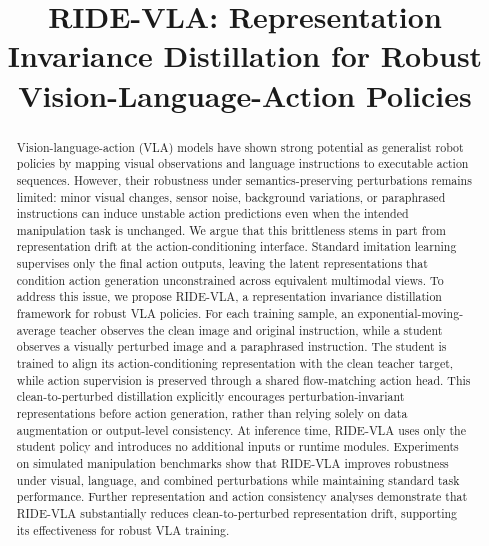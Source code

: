\documentclass[letterpaper]{article} %
\title{\textsc{RIDE-VLA}: Representation Invariance Distillation for Robust Vision-Language-Action Policies}
\newcommand{\method}{\textsc{RIDE-VLA}}
\begin{document}
\maketitle

\begin{abstract}
Vision-language-action (VLA) models have shown strong potential as generalist robot policies by mapping visual observations and language instructions to executable action sequences. However, their robustness under semantics-preserving perturbations remains limited: minor visual changes, sensor noise, background variations, or paraphrased instructions can induce unstable action predictions even when the intended manipulation task is unchanged. We argue that this brittleness stems in part from representation drift at the action-conditioning interface. Standard imitation learning supervises only the final action outputs, leaving the latent representations that condition action generation unconstrained across equivalent multimodal views. To address this issue, we propose \method{}, a representation invariance distillation framework for robust VLA policies. For each training sample, an exponential-moving-average teacher observes the clean image and original instruction, while a student observes a visually perturbed image and a paraphrased instruction. The student is trained to align its action-conditioning representation with the clean teacher target, while action supervision is preserved through a shared flow-matching action head. This clean-to-perturbed distillation explicitly encourages perturbation-invariant representations before action generation, rather than relying solely on data augmentation or output-level consistency. At inference time, \method{} uses only the student policy and introduces no additional inputs or runtime modules. Experiments on simulated manipulation benchmarks show that \method{} improves robustness under visual, language, and combined perturbations while maintaining standard task performance. Further representation and action consistency analyses demonstrate that \method{} substantially reduces clean-to-perturbed representation drift, supporting its effectiveness for robust VLA training.
\end{abstract}

\end{document}

